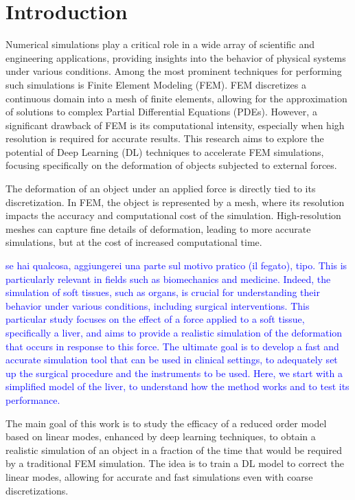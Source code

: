 \section{Introduction}
Numerical simulations play a critical role in a wide array of scientific and engineering applications, providing insights into the behavior of physical systems under various conditions. Among the most prominent techniques for performing such simulations is Finite Element Modeling (FEM). FEM discretizes a continuous domain into a mesh of finite elements, allowing for the approximation of solutions to complex Partial Differential Equations (PDEs). However, a significant drawback of FEM is its computational intensity, especially when high resolution is required for accurate results. This research aims to explore the potential of Deep Learning (DL) techniques to accelerate FEM simulations, focusing specifically on the deformation of objects subjected to external forces.

The deformation of an object under an applied force is directly tied to its discretization. In FEM, the object is represented by a mesh, where its resolution impacts the accuracy and computational cost of the simulation. High-resolution meshes can capture fine details of deformation, leading to more accurate simulations, but at the cost of increased computational time.

\textcolor{blue}{se hai qualcosa, aggiungerei una parte sul motivo pratico (il fegato), tipo. This is particularly relevant in fields such as biomechanics and medicine. Indeed, the simulation of soft tissues, such as organs, is crucial for understanding their behavior under various conditions, including surgical interventions. This particular study focuses on the effect of a force applied to a soft tissue, specifically a liver, and aims to provide a realistic simulation of the deformation that occurs in response to this force. The ultimate goal is to develop a fast and accurate simulation tool that can be used in clinical settings, to adequately set up the surgical procedure and the instruments to be used. Here, we start with a simplified model of the liver, to understand how the method works and to test its performance.}

The main goal of this work is to study the efficacy of a reduced order model based on linear modes, enhanced by deep learning techniques, to obtain a realistic simulation of an object in a fraction of the time that would be required by a traditional FEM simulation. The idea is to train a DL model to correct the linear modes, allowing for accurate and fast simulations even with coarse discretizations.


